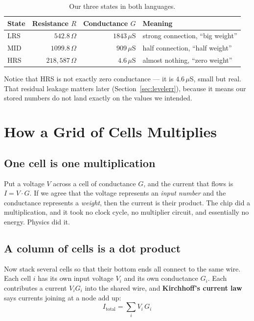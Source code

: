 \documentclass[11pt,a4paper]{report}
\newcommand{\jargon}[1]{\textcolor{acc}{\textbf{#1}}}
\begin{document}
\begin{table}[h]
\centering
\caption{Our three states in both languages.}
\begin{tabular}{lrrl}
\toprule
State & Resistance $R$ & Conductance $G$ & Meaning \\
\midrule
LRS  & $542.8\,\Omega$        & $1843\,\mu$S  & strong connection, ``big weight'' \\
MID  & $1099.8\,\Omega$       & $909\,\mu$S   & half connection, ``half weight'' \\
HRS  & $218{,}587\,\Omega$    & $4.6\,\mu$S   & almost nothing, ``zero weight'' \\
\bottomrule
\end{tabular}
\end{table}

Notice that HRS is not exactly zero conductance --- it is $4.6\,\mu$S, small
but real. That residual leakage matters later (Section~\ref{sec:levelerr}),
because it means our stored numbers do not land exactly on the values we
intended.

\chapter{How a Grid of Cells Multiplies}

\section{One cell is one multiplication}

Put a voltage $V$ across a cell of conductance $G$, and the current that flows
is $I = V\cdot G$. If we agree that the voltage represents an \emph{input
number} and the conductance represents a \emph{weight}, then the current is
their product. The chip did a multiplication, and it took no clock cycle, no
multiplier circuit, and essentially no energy. Physics did it.

\section{A column of cells is a dot product}

Now stack several cells so that their bottom ends all connect to the same
wire. Each cell $i$ has its own input voltage $V_i$ and its own conductance
$G_i$. Each contributes a current $V_i G_i$ into the shared wire, and
\jargon{Kirchhoff's current law} says currents joining at a node add up:
\[
I_{\mathrm{total}} = \sum_i V_i \, G_i
\]
\end{document}
